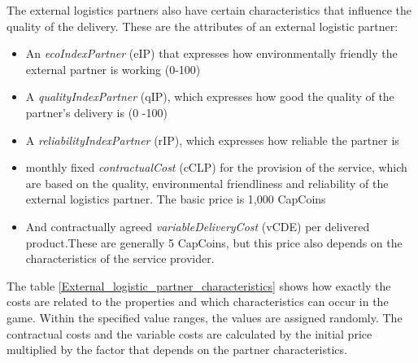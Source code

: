 The external logistics partners also have certain characteristics that influence the quality of the delivery. These are the attributes of an external logistic partner:  

\begin{itemize}
    \item An \textit{ecoIndexPartner} (\gls{eIP}) that expresses how environmentally friendly the external partner is working (0-100)
    \item A \textit{qualityIndexPartner} (\gls{qIP}), which expresses how good the quality of the partner's delivery is (0 -100)
    \item A \textit{reliabilityIndexPartner} (\gls{rIP}), which expresses how reliable the partner is
    \item monthly fixed \textit{contractualCost} (\gls{cCLP}) for the provision of the service, which are based on the quality, environmental friendliness and reliability of the external logistics partner. The basic price is 1,000 CapCoins 
    \item And contractually agreed \textit{variableDeliveryCost} (\gls{vCDE}) per delivered product.These are generally 5 CapCoins, but this price also depends on the characteristics of the service provider.
\end{itemize}

The table \ref{External_logistic_partner_characteristics} shows how exactly the costs are related to the properties and which characteristics can occur in the game. Within the specified value ranges, the values are assigned randomly. The contractual costs and the variable costs are calculated by the initial price multiplied by the factor that depends on the partner characteristics.

